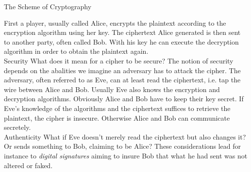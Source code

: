 \documentclass[final,hyperref={pdfpagelabels=false}]{beamer}
\newcommand{\gearmacro}[5]{%
    \foreach \i in {1,...,#1} {%
      [rotate=(\i-1)*360/#1]  (0:#2)  arc (0:#4:#2) {[rounded corners=1.5pt]
        -- (#4+#5:#3)  arc (#4+#5:360/#1-#5:#3)} --  (360/#1:#2)
    }}
\begin{document}
\begin{frame}{}
\begin{columns}[t]
\begin{column}{.65\linewidth}
\begin{alertblock}{The Scheme of Cryptography}
\begin{figure}
    \end{figure}
    First a player, usually called Alice, encrypts the plaintext according to the encryption algorithm using her key. The ciphertext Alice generated is then sent to another party, often called Bob. With his key he can execute the decryption algorithm in order to obtain the plaintext again. \\
    \alert{Security} 
      What does it mean for a cipher to be secure? The notion of security depends on the abalities we imagine an adversary has to attack the cipher. The adversary, often referred to as Eve, can at least read the ciphertext, i.e. tap the wire between Alice and Bob. Usually Eve also knows the encryption and decryption algorithms. Obviously Alice and Bob have to keep their key secret. If Eve's knowledge of the algorithms and the ciphertext suffices to retrieve the plaintext, the cipher is insecure. Otherwise Alice and Bob can communicate secretely. \\
    \alert{Authenticity} 
      What if Eve doesn't merely read the ciphertext but also changes it? Or sends something to Bob, claiming to be Alice? These considerations lead for instance to {\em digital signatures} aiming to insure Bob that what he had sent was not altered or faked.
    \end{alertblock}
    \end{column}
    \end{columns}
    \begin{columns}[t]
    \begin{column}{.32\linewidth}

\end{column}
\end{columns}
\end{frame}
\end{document}
